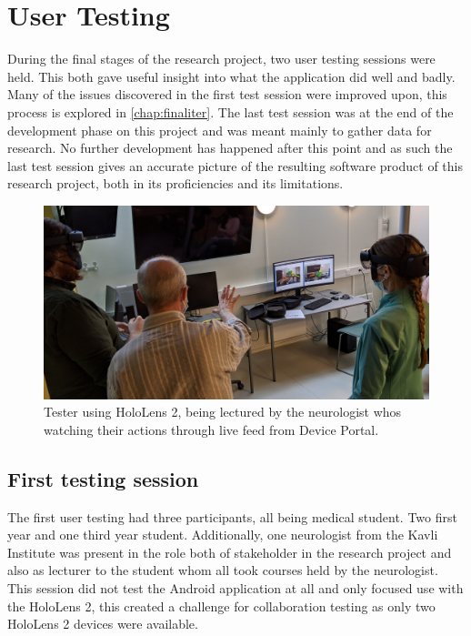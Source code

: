 \section{User Testing}
During the final stages of the research project, two user testing sessions were held. This both gave useful insight into what the application did well and badly. Many of the issues discovered in the first test session were improved upon, this process is explored in \autoref{chap:finaliter}. The last test session was at the end of the development phase on this project and was meant mainly to gather data for research. No further development has happened after this point and as such the last test session gives an accurate picture of the resulting software product of this research project, both in its proficiencies and its limitations. 

\begin{figure}[ht]
    \includegraphics[width={\textwidth}]{fig/usertesthololivestream.jpg}
    \caption{Tester using HoloLens 2, being lectured by the neurologist whos watching their actions through live feed from Device Portal.}
    \label{fig:usertesthololivestream}
\end{figure}

\subsection*{First testing session}

The first user testing had three participants, all being medical student. Two first year and one third year student. Additionally, one neurologist from the Kavli Institute was present in the role both of stakeholder in the research project and also as lecturer to the student whom all took courses held by the neurologist. This session did not test the Android application at all and only focused use with the HoloLens 2, this created a challenge for collaboration testing as only two HoloLens 2 devices were available. 

